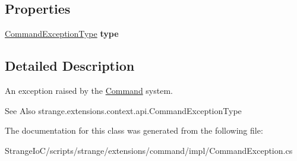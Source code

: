 \subsection*{Properties}
\begin{DoxyCompactItemize}
\item 
\hypertarget{classstrange_1_1extensions_1_1command_1_1impl_1_1_command_exception_a747aab5606e9b9be1e14da8d167c9c83}{\hyperlink{namespacestrange_1_1extensions_1_1command_1_1api_a27c9226cc8d55624f3294319d48879e3}{Command\-Exception\-Type} {\bfseries type}}\label{classstrange_1_1extensions_1_1command_1_1impl_1_1_command_exception_a747aab5606e9b9be1e14da8d167c9c83}

\end{DoxyCompactItemize}


\subsection{Detailed Description}
An exception raised by the \hyperlink{classstrange_1_1extensions_1_1command_1_1impl_1_1_command}{Command} system. 

\begin{DoxySeeAlso}{See Also}
strange.\-extensions.\-context.\-api.\-Command\-Exception\-Type 
\end{DoxySeeAlso}


The documentation for this class was generated from the following file\-:\begin{DoxyCompactItemize}
\item 
Strange\-Io\-C/scripts/strange/extensions/command/impl/Command\-Exception.\-cs\end{DoxyCompactItemize}
